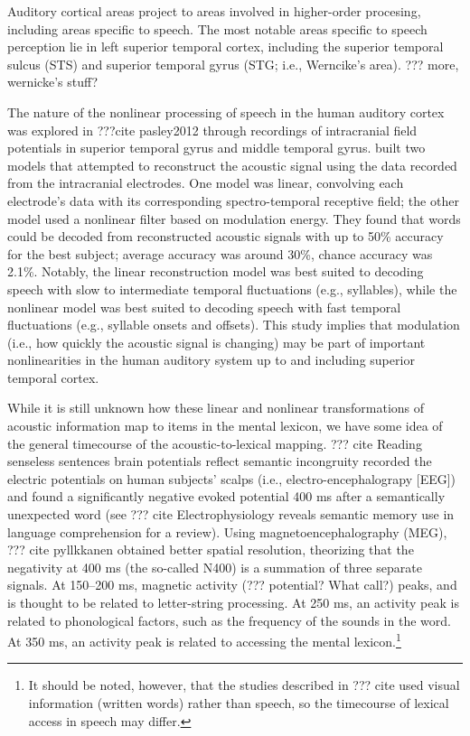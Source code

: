 Auditory cortical areas project
to areas involved in
higher-order procesing,
including areas specific to speech.
The most notable areas
specific to speech perception
lie in left superior temporal cortex,
including the superior temporal sulcus (STS)
and superior temporal gyrus
(STG; i.e., Werncike's area).
??? more, wernicke's stuff?

The nature of the nonlinear processing
of speech in the human auditory cortex
was explored in ???cite pasley2012
through recordings of
intracranial field potentials
in superior temporal gyrus
and middle temporal gyrus.
\citeauthor{???} built
two models that attempted to
reconstruct the acoustic signal
using the data recorded from
the intracranial electrodes.
One model was linear,
convolving each electrode's data
with its corresponding
spectro-temporal receptive field;
the other model used
a nonlinear filter
based on modulation energy.
They found that
words could be decoded from
reconstructed acoustic signals
with up to 50\% accuracy
for the best subject;
average accuracy was around 30\%,
chance accuracy was 2.1\%.
Notably, the linear reconstruction model
was best suited to decoding speech
with slow to intermediate temporal fluctuations
(e.g., syllables),
while the nonlinear model was best suited
to decoding speech with fast temporal fluctuations
(e.g., syllable onsets and offsets).
This study implies that modulation
(i.e., how quickly the acoustic signal is changing)
may be part of important nonlinearities
in the human auditory system
up to and including superior temporal cortex.

While it is still unknown how
these linear and nonlinear
transformations of acoustic information
map to items in the mental lexicon,
we have some idea of the general
timecourse of the
acoustic-to-lexical mapping.
??? cite
Reading senseless sentences brain potentials reflect semantic incongruity
recorded the electric potentials
on human subjects' scalps
(i.e., electro-encephalograpy [EEG])
and found a significantly
negative evoked potential
400 ms after a semantically unexpected word
(see ??? cite
Electrophysiology reveals semantic memory use in language comprehension
for a review).
Using magnetoencephalography (MEG),
??? cite pyllkkanen
obtained better spatial resolution,
theorizing that the negativity
at 400 ms (the so-called N400)
is a summation of three separate signals.
At 150--200 ms, magnetic activity (??? potential? What call?)
peaks, and is thought to be related to
letter-string processing.
At 250 ms, an activity peak
is related to phonological factors,
such as the frequency of the sounds in the word.
At 350 ms, an activity peak
is related to accessing the mental lexicon.\footnote{
  It should be noted, however,
  that the studies described in
  ??? cite used visual information
  (written words) rather than speech,
  so the timecourse of lexical access
  in speech may differ.}

